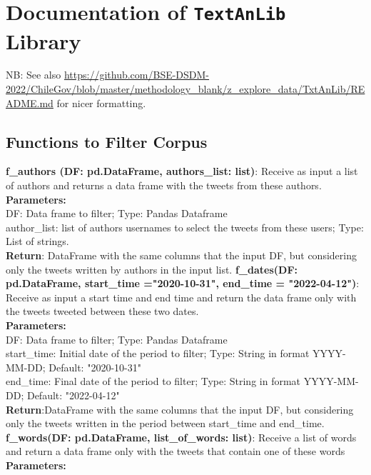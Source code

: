 \newpage
\section{Documentation of \texttt{TextAnLib} Library}\label{appsec_txtanlib_doc}
NB: See also \url{https://github.com/BSE-DSDM-2022/ChileGov/blob/master/methodology_blank/z_explore_data/TxtAnLib/README.md} for nicer formatting.

\subsection{Functions to Filter Corpus}

\textbf{f\_authors (DF: pd.DataFrame, authors\_list: list)}:
Receive as input a list of authors and returns a data frame with the tweets from these authors.\\
\textbf{Parameters:}\\
DF: Data frame to filter; Type: Pandas Dataframe\\
author\_list: list of authors usernames to select the tweets from these users; Type: List of strings.\\
\textbf{Return}: DataFrame with the same columns that the input DF, but considering only the tweets written by authors in the input list.
\newline 
\newline
\noindent \textbf{f\_dates(DF: pd.DataFrame, start\_time ="2020-10-31", end\_time = "2022-04-12")}:
Receive as input a start time and end time and return the data frame only with the tweets tweeted between these two dates.\\
\textbf{Parameters:}\\
DF: Data frame to filter; Type: Pandas Dataframe\\
start\_time: Initial date of the period to filter; Type: String in format YYYY-MM-DD; Default: "2020-10-31"\\
end\_time: Final date of the period to filter; Type: String in format YYYY-MM-DD; Default: "2022-04-12"\\
\textbf{Return}:DataFrame with the same columns that the input DF, but considering only the tweets written in the period between start\_time and end\_time.
\newline 
\newline
\noindent\textbf{f\_words(DF: pd.DataFrame, list\_of\_words: list)}: Receive a list of words and return a data frame only with the tweets that contain one of these words\\
\textbf{Parameters:}\\

